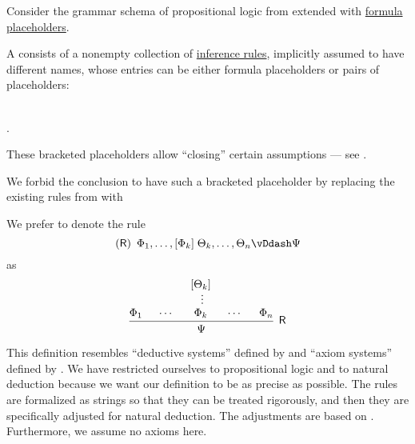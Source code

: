 \begin{definition}\label{def:propositional_natural_deduction_system}\mimprovised
  Consider the grammar schema of propositional logic from  extended with \hyperref[def:propositional_formula_placeholder]{formula placeholders}.

  A  consists of a nonempty collection of \hyperref[def:inference_rule]{inference rules}, implicitly assumed to have different names, whose entries can be either formula placeholders or pairs of placeholders:
  \begin{bnf*}
     { \bnfor} \\
    .
  \end{bnf*}

  These bracketed placeholders allow \enquote{closing} certain assumptions --- see .

  We forbid the conclusion to have such a bracketed placeholder by replacing the existing rules from  with
  \begin{bnf*}
     {}
  \end{bnf*}

  We prefer to denote the rule
  \begin{equation*}
    (\logic{R}) \enspace \Phi_1, \ldots, [\Phi_k] \thickspace \Theta_k, \ldots, \Theta_n \vDdash \Psi
  \end{equation*}
  as
  \begin{equation*}
    \begin{prooftree}
      \hypo{ \Phi_1 }
      \hypo{ \cdots }
      \hypo{ [\Theta_k] }
      \ellipsis {} { \Phi_k }
      \hypo{ \cdots }
      \hypo{ \Phi_n }
      \infer5[\logic{R}]{ \Psi }
    \end{prooftree}
  \end{equation*}
\end{definition}
\begin{comments}
  \item This definition resembles \enquote{deductive systems} defined by  and \enquote{axiom systems} defined by . We have restricted ourselves to propositional logic and to natural deduction because we want our definition to be as precise as possible. The rules are formalized as strings so that they can be treated rigorously, and then they are specifically adjusted for natural deduction. The adjustments are based on \cite[sec. 2.1]{TroelstraSchwichtenberg2000}. Furthermore, we assume no axioms here.
\end{comments}

